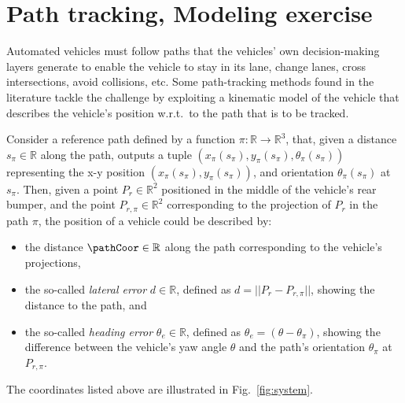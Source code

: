 	\section{Path tracking, Modeling exercise}
		Automated vehicles must follow paths that the vehicles' own decision-making layers generate to enable the vehicle to stay in its lane, change lanes, cross intersections, avoid collisions, etc. 
		Some path-tracking methods found in the literature tackle the challenge by exploiting a kinematic model of the vehicle that describes the vehicle's position w.r.t.\ to the path that is to be tracked.

		Consider a reference path defined by a function %
		$\pi : \mathbb{R}\to\mathbb{R}^3$, %
		that, given a distance %
		$s_\pi\in\mathbb{R}$ %
		along the path, outputs a tuple %
		$(x_\pi(s_\pi), y_\pi(s_\pi), \theta_\pi(s_\pi))$ %
		representing the x-y position %
		$(x_\pi(s_\pi), y_\pi(s_\pi))$, %
		and orientation %
		$\theta_\pi(s_\pi)$ %
		at %
		$s_\pi$. %
		Then, given a point %
		$P_r\in\mathbb{R}^2$ %
		positioned in the middle of the vehicle's rear bumper, and the point %
		$P_{r,\pi}\in\mathbb{R}^2$ %
		corresponding to the projection of %
		$P_r$ %
		in the path %
		$\pi$, %
		the position of a vehicle could be described by:
		\begin{itemize}
			\item the distance %
			$\pathCoor\in\mathbb{R}$ %
			along the path corresponding to the vehicle's projections, 
			\item the so-called \emph{lateral error} %
			$d\in\mathbb{R}$, %
			defined as %
			$d = ||P_r - P_{r,\pi}||$, %
			showing the distance to the path, and
			\item the so-called \emph{heading error} %
			$\theta_e \in \mathbb{R}$, %
			defined as %
			$\theta_e = (\theta - \theta_\pi)$, %
			showing the difference between the vehicle's yaw angle $\theta$ and the path's orientation %
			$\theta_\pi$ at $P_{r,\pi}$. 
 		\end{itemize}
 		The coordinates listed above are illustrated in Fig.\ \ref{fig:system}.

